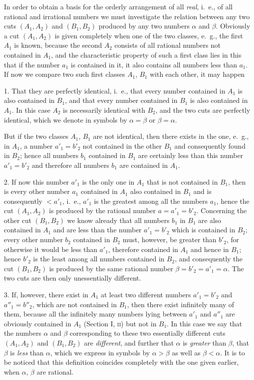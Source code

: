 \documentclass[polutonikogreek,english,twoside,openright]{article}
\begin{document}
In order to obtain a basis for the orderly arrangement of all
\textit{real}, i.~e., of all rational and irrational numbers we must
investigate the relation between any two cuts $(A_1, A_2)$ and
$(B_1, B_2)$ produced by any two numbers $\alpha$ and
$\beta$. Obviously a cut $(A_1, A_2)$ is given completely when one of
the two classes, e.~g., the first $A_1$ is known, because the second
$A_2$ consists of all rational numbers not contained in $A_1$, and the
characteristic property of such a first class lies in this that if the
number $a_1$ is contained in it, it also contains all numbers less
than $a_1$. If now we compare two such first classes $A_1$, $B_1$ with
each other, it may happen

1. That they are perfectly identical, i.~e., that every number
contained in $A_1$ is also contained in $B_1$, and that every number
contained in $B_1$ is also contained in $A_1$. In this case $A_2$ is
necessarily identical with $B_2$, and the two cuts are perfectly
identical, which we denote in symbols by $\alpha=\beta$ or
$\beta=\alpha$.

But if the two classes $A_1$, $B_1$ are not identical, then there
exists in the one, e.~g., in $A_1$, a number $a'_1=b'_2$ not contained
in the other $B_1$ and consequently found in $B_2$; hence all numbers
$b_1$ contained in $B_1$ are certainly less than this number
$a'_1=b'_2$ and therefore all numbers $b_1$ are contained in $A_1$.

2. If now this number $a'_1$ is the only one in $A_1$ that is not
contained in $B_1$, then is every other number $a_1$ contained in
$A_1$ also contained in $B_1$ and is consequently $<a'_1$, i.~e.,
$a'_1$ is the greatest among all the numbers $a_1$, hence the cut
$(A_1, A_2)$ is produced by the rational number
$a=a'_1=b'_2$. Concerning the other cut $(B_1, B_2)$ we know already
that all numbers $b_1$ in $B_1$ are also contained in $A_1$ and are
less than the number $a'_1=b'_2$ which is contained in $B_2$; every
other number $b_2$ contained in $B_2$ must, however, be greater than
$b'_2$, for otherwise it would be less than $a'_1$, therefore
contained in $A_1$ and hence in $B_1$; hence $b'_2$ is the least among
all numbers contained in $B_2$, and consequently the cut $(B_1, B_2)$
is produced by the same rational number
$\beta = b'_2 = a'_1 = \alpha$. The two cuts are then only
unessentially different.

3. If, however, there exist in $A_1$ at least two different numbers
$a'_1 = b'_2$ and $a''_1 = b''_2$, which are not contained in $B_1$,
then there exist infinitely many of them, because all the infinitely
many numbers lying between $a'_1$ and $a''_1$ are obviously contained
in $A_1$ (Section I, \textsc{ii}) but not in $B_1$. In this case we
say that the numbers $\alpha$ and $\beta$ corresponding to these two
essentially different cuts $(A_1, A_2)$ and $(B_1, B_2)$ are
\textit{different}, and further that $\alpha$ is \textit{greater} than
$\beta$, that $\beta$ is \textit{less} than $\alpha$, which we express
in symbols by $\alpha > \beta$ as well as $\beta < \alpha$.  It is to
be noticed that this definition coincides completely with the one
given earlier, when $\alpha$, $\beta$ are rational.
\end{document}
